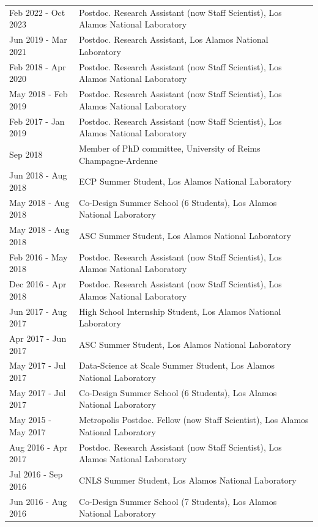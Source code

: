 \documentclass{article}
\begin{document}
\begin{longtable}{p{}p{}}
Feb 2022 - Oct 2023 & Postdoc. Research Assistant (now Staff Scientist), Los Alamos National Laboratory \\
Jun 2019 - Mar 2021 & Postdoc. Research Assistant, Los Alamos National Laboratory \\
Feb 2018 - Apr 2020 & Postdoc. Research Assistant (now Staff Scientist), Los Alamos National Laboratory \\
May 2018 - Feb 2019 & Postdoc. Research Assistant (now Staff Scientist), Los Alamos National Laboratory \\
Feb 2017 - Jan 2019 & Postdoc. Research Assistant (now Staff Scientist), Los Alamos National Laboratory \\
Sep 2018 & Member of PhD committee, University of Reims Champagne-Ardenne \\
Jun 2018 - Aug 2018 & ECP Summer Student, Los Alamos National Laboratory \\
May 2018 - Aug 2018 & Co-Design Summer School (6 Students), Los Alamos National Laboratory \\
May 2018 - Aug 2018 & ASC Summer Student, Los Alamos National Laboratory \\
Feb 2016 - May 2018 & Postdoc. Research Assistant (now Staff Scientist), Los Alamos National Laboratory \\
Dec 2016 - Apr 2018 & Postdoc. Research Assistant (now Staff Scientist), Los Alamos National Laboratory \\
Jun 2017 - Aug 2017 & High School Internship Student, Los Alamos National Laboratory \\
Apr 2017 - Jun 2017 & ASC Summer Student, Los Alamos National Laboratory \\
May 2017 - Jul 2017 & Data-Science at Scale Summer Student, Los Alamos National Laboratory \\
May 2017 - Jul 2017 & Co-Design Summer School (6 Students), Los Alamos National Laboratory \\
May 2015 - May 2017 & Metropolis Postdoc. Fellow (now Staff Scientist), Los Alamos National Laboratory \\
Aug 2016 - Apr 2017 & Postdoc. Research Assistant (now Staff Scientist), Los Alamos National Laboratory \\
Jul 2016 - Sep 2016 & CNLS Summer Student, Los Alamos National Laboratory \\
Jun 2016 - Aug 2016 & Co-Design Summer School (7 Students), Los Alamos National Laboratory \\

\end{longtable}
\end{document}
